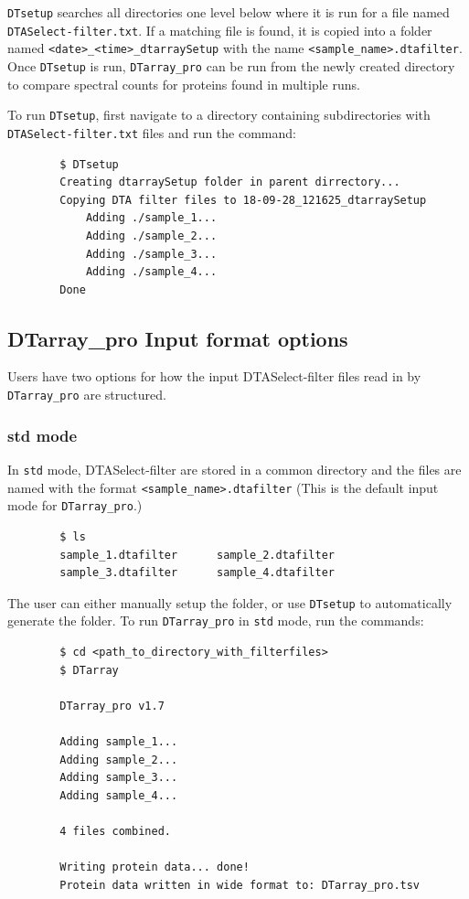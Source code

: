 \documentclass[12pt]{article}
\begin{document}
	\texttt{DTsetup} searches all directories one level below where it is run for a file named \texttt{DTASelect-filter.txt}. If a matching file is found, it is copied into a folder named \texttt{<date>\_<time>\_dtarraySetup} with the name \texttt{<sample\_name>.dtafilter}. Once \texttt{DTsetup} is run, \texttt{DTarray\_pro} can be run from the newly created directory to compare spectral counts for proteins found in multiple runs.
	
	\bigskip
	\noindent
	To run \texttt{DTsetup}, first navigate to a directory containing subdirectories with \texttt{DTASelect-filter.txt} files and run the command:
	
	\begin{lstlisting}
		$ DTsetup
		Creating dtarraySetup folder in parent dirrectory...
		Copying DTA filter files to 18-09-28_121625_dtarraySetup
			Adding ./sample_1...
			Adding ./sample_2...
			Adding ./sample_3...
			Adding ./sample_4...
		Done
	\end{lstlisting}
	
	\subsection{DTarray\_pro Input format options}
	
	Users have two options for how the input DTASelect-filter files read in by \texttt{DTarray\_pro} are structured.  
	
	\subsubsection{std mode} 
		
	In \texttt{std} mode, DTASelect-filter are stored in a common directory and the files are named with the format \texttt{<sample\_name>.dtafilter} (This is the default input mode for \texttt{DTarray\_pro}.)
	
	\begin{lstlisting}
		$ ls
		sample_1.dtafilter		sample_2.dtafilter
		sample_3.dtafilter		sample_4.dtafilter
	\end{lstlisting}
	
	\noindent
	The user can either manually setup the folder, or use \texttt{DTsetup} to automatically generate the folder.  To run \texttt{DTarray\_pro} in \texttt{std} mode, run the commands:
	
	\begin{lstlisting}
		$ cd <path_to_directory_with_filterfiles>
		$ DTarray
		
		DTarray_pro v1.7
		
		Adding sample_1...
		Adding sample_2...
		Adding sample_3...
		Adding sample_4...
		
		4 files combined.
		
		Writing protein data... done!
		Protein data written in wide format to: DTarray_pro.tsv
		
	\end{lstlisting}
	
\end{document}
